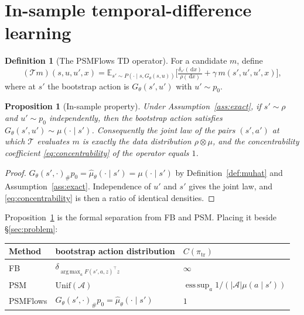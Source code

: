 \documentclass[11pt]{article}
\theoremstyle{plain}
\newtheorem{proposition}[lemma]{Proposition}
\theoremstyle{definition}
\newtheorem{definition}[lemma]{Definition}
\theoremstyle{remark}
\newcommand{\Aspace}{\mathcal A}
\newcommand{\E}{\mathbb E}
\newcommand{\1}{\mathbf 1}
\newcommand{\argmax}{\operatorname*{arg\,max}}
\newcommand{\dd}{\,\mathrm d}
\newcommand{\Gth}{G_\theta}
\newcommand{\muhat}{\hat\mu_\theta}
\begin{document}
\section{In-sample temporal-difference learning}
\label{sec:insample}

\begin{definition}[The PSMFlows TD operator]
\label{def:operator}
For a candidate $m$, define
\begin{equation}
\label{eq:operator}
  (\mathcal T m)(s,u,u',x)
  =\E_{s'\sim P(\cdot\mid s,\Gth(s,u))}
   \Big[\tfrac{\delta_{s'}(\dd x)}{\rho(\dd x)}+\gamma\,m(s',u',u',x)\Big],
\end{equation}
where at $s'$ the bootstrap action is $\Gth(s',u')$ with $u'\sim p_0$.
\end{definition}

\begin{proposition}[In-sample property]
\label{prop:insample}
Under Assumption~\ref{ass:exact}, if $s'\sim\rho$ and $u'\sim p_0$ independently, then the
bootstrap action satisfies $\Gth(s',u')\sim\mu(\cdot\mid s')$. Consequently the joint law
of the pairs $(s',a')$ at which $\mathcal T$ evaluates $m$ is exactly the data distribution
$\rho\otimes\mu$, and the concentrability coefficient \eqref{eq:concentrability} of the
operator equals $1$.
\end{proposition}

\begin{proof}
$\Gth(s',\cdot)_\#p_0=\muhat(\cdot\mid s')=\mu(\cdot\mid s')$ by
Definition~\ref{def:muhat} and Assumption~\ref{ass:exact}. Independence of $u'$ and $s'$
gives the joint law, and \eqref{eq:concentrability} is then a ratio of identical densities.
\end{proof}

\noindent
Proposition~\ref{prop:insample} is the formal separation from FB and PSM. Placing it beside
\S\ref{sec:problem}:
\begin{center}
\begin{tabular}{lll}
\toprule
Method & bootstrap action distribution & $C(\pi_{\mathrm{tr}})$ \\
\midrule
FB      & $\delta_{\argmax_a F(s',a,z)^\top z}$ & $\infty$ \\
PSM     & $\mathrm{Unif}(\Aspace)$              & $\operatorname*{ess\,sup}_a 1/(|\Aspace|\mu(a\mid s'))$ \\
PSMFlows& $\Gth(s',\cdot)_\#p_0=\muhat(\cdot\mid s')$ & $1$ \\
\bottomrule
\end{tabular}
\end{center}
\end{document}
